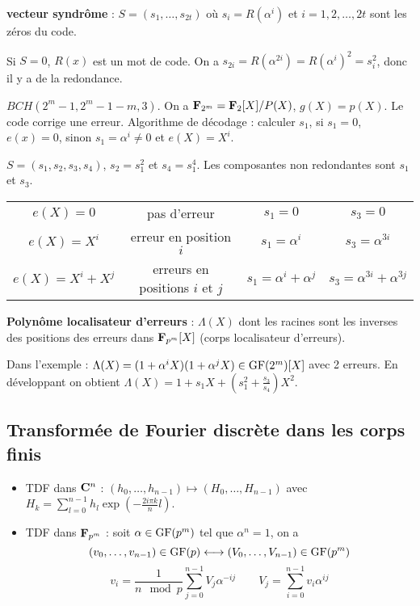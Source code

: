 	\begin{defn}
		\textbf{vecteur syndrôme} : $S = (s_1,\ldots,s_{2t})$ où $s_i = R(\alpha^i)$ et $i = 1, 2, \ldots, 2t$ sont les zéros du code.
	\end{defn}

	Si $S = 0$, $R(x)$ est un mot de code.
	On a $s_{2i} = R(\alpha^{2i}) = R(\alpha^i)^2 = s_i^2$, donc il y a de la redondance.

	\begin{ex}
		$BCH(2^m - 1, 2^m - 1 - m, 3)$.
		On a $\mathbf{F}_{2^m} = \mathbf{F}_{2}[X]/P(X)$, $g(X) = p(X)$.
		Le code corrige une erreur.
		Algorithme de décodage : calculer $s_1$, si $s_1 = 0$, $e(x) = 0$, sinon $s_1 = \alpha^i \neq 0$ et $e(X) = X^i$.
	\end{ex}

	\begin{ex}
		$S = (s_1,s_2,s_3,s_4)$, $s_2 = s_1^2$ et $s_4 = s_1^4$.
		Les composantes non redondantes sont $s_1$ et $s_3$.
		\begin{tabular}{cccc}
			$e(X) = 0$ & pas d'erreur & $s_1 = 0$ & $s_3 = 0$ \\
			$e(X) = X^i$ & erreur en position $i$ & $s_1 = \alpha^i$ & $s_3 = \alpha^{3i}$ \\
			$e(X) = X^i + X^j$ & erreurs en positions $i$ et $j$ & $s_1 = \alpha^i + \alpha^j$ & $s_3 = \alpha^{3i} + \alpha^{3j}$
		\end{tabular}
	\end{ex}

	\begin{defn}
		\textbf{Polynôme localisateur d'erreurs} : $\Lambda(X)$ dont les racines sont les inverses des positions des erreurs dans $\mathbf{F}_{p^m}[X]$ (corps localisateur d'erreurs).
	\end{defn}

	Dans l'exemple : $\Lambda(X) = (1 + \alpha^i X)(1 + \alpha^j X) \in \mathrm{GF}(2^m)[X]$ avec 2 erreurs.
	En développant on obtient $\Lambda(X) = 1 + s_1 X + \left( s_1^2 + \frac{s_3}{s_4} \right) X^2$.


\subsection{Transformée de Fourier discrète dans les corps finis}

	\begin{itemize}
		\item[\textbullet] TDF dans $\mathbf{C}^n$ : $(h_0,\ldots,h_{n - 1}) \mapsto (H_0,\ldots,H_{n - 1})$ avec $H_k = \sum_{l = 0}^{n - 1} h_l \exp \left( - \frac{2i\pi k}{n} l \right)$.
		\item[\textbullet] TDF dans $\mathbf{F}_{p^m}$ : soit $\alpha \in \mathrm{GF}(p^m)$ tel que $\alpha^n = 1$, on a
			$$(v_0,\ldots,v_{n - 1}) \in \mathrm{GF}(p) \longleftrightarrow (V_0,\ldots,V_{n - 1}) \in \mathrm{GF}(p^m)$$
			$$v_i = \frac{1}{n \mod{p}} \sum_{j = 0}^{n - 1} V_j \alpha^{-ij} \qquad V_j = \sum_{i = 0}^{n - 1} v_i \alpha^{ij}$$
	\end{itemize}

